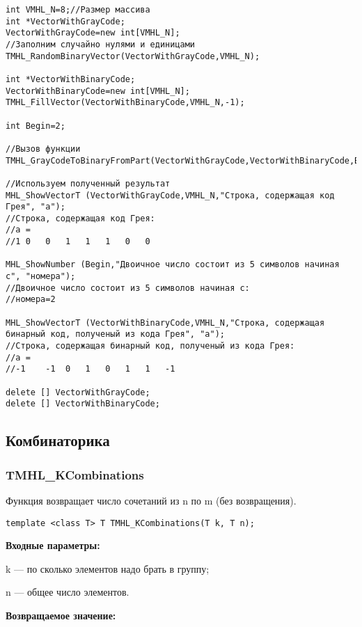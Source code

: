 \documentclass[a4paper,12pt]{article}
\begin{document}
\begin{lstlisting}[label=code_use_TMHL_GrayCodeToBinaryFromPart,caption=Пример использования]
int VMHL_N=8;//Размер массива
int *VectorWithGrayCode;
VectorWithGrayCode=new int[VMHL_N];
//Заполним случайно нулями и единицами
TMHL_RandomBinaryVector(VectorWithGrayCode,VMHL_N);

int *VectorWithBinaryCode;
VectorWithBinaryCode=new int[VMHL_N];
TMHL_FillVector(VectorWithBinaryCode,VMHL_N,-1);

int Begin=2;

//Вызов функции
TMHL_GrayCodeToBinaryFromPart(VectorWithGrayCode,VectorWithBinaryCode,Begin,5);

//Используем полученный результат
MHL_ShowVectorT (VectorWithGrayCode,VMHL_N,"Строка, содержащая код Грея", "a");
//Строка, содержащая код Грея:
//a =	
//1	0	0	1	1	1	0	0

MHL_ShowNumber (Begin,"Двоичное число состоит из 5 символов начиная с", "номера");
//Двоичное число состоит из 5 символов начиная с:
//номера=2

MHL_ShowVectorT (VectorWithBinaryCode,VMHL_N,"Строка, содержащая бинарный код, полученый из кода Грея", "a");
//Строка, содержащая бинарный код, полученый из кода Грея:
//a =	
//-1	-1	0	1	0	1	1	-1

delete [] VectorWithGrayCode;
delete [] VectorWithBinaryCode;
\end{lstlisting}

\subsection{Комбинаторика}

\subsubsection{TMHL\_KCombinations}\label{TMHL_KCombinations}

Функция возвращает число сочетаний из n по m (без возвращения).


\begin{lstlisting}[label=code_syntax_TMHL_KCombinations,caption=Синтаксис]
template <class T> T TMHL_KCombinations(T k, T n);
\end{lstlisting}

\textbf{Входные параметры:}  
 
 k --- по сколько элементов надо брать в группу;
 
 n --- общее число элементов.

\textbf{Возвращаемое значение:}
\end{document}
